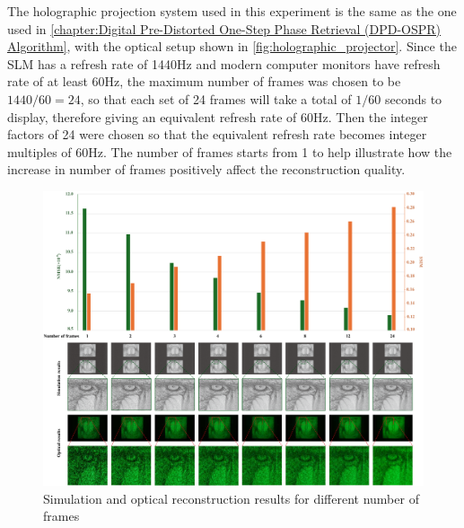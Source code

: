 	The holographic projection system used in this experiment is the same as the one used in \cref{chapter:Digital Pre-Distorted One-Step Phase Retrieval (DPD-OSPR) Algorithm}, with the optical setup shown in \cref{fig:holographic_projector}. Since the SLM has a refresh rate of 1440Hz and modern computer monitors have refresh rate of at least 60Hz, the maximum number of frames was chosen to be $1440/60=24$, so that each set of 24 frames will take a total of $1/60$ seconds to display, therefore giving an equivalent refresh rate of 60Hz. Then the integer factors of 24 were chosen so that the equivalent refresh rate becomes integer multiples of 60Hz. The number of frames starts from 1 to help illustrate how the increase in number of frames positively affect the reconstruction quality.

	\begin{figure}[h!t]
		\centering
		\includegraphics[width=1.0\textwidth]{recon_quality_vs_num_frames.pdf}
		\caption{Simulation and optical reconstruction results for different number of frames}
		\label{fig:recon_quality_vs_num_frames}
	\end{figure}

